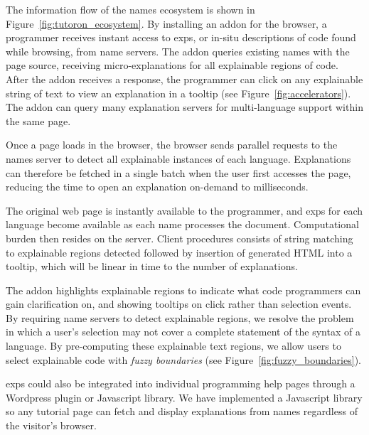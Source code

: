 The information flow of the \Glspl{name} ecosystem is shown in Figure~\ref{fig:tutoron_ecosystem}.
By installing an addon for the browser, a programmer receives instant access to \glspl{exp}, or in-situ descriptions of code found while browsing, from \Gls{name} servers.
The addon queries existing \Glspl{name} with the page source, receiving micro-explanations for all explainable regions of code.
After the addon receives a response, the programmer can click on any explainable string of text to view an explanation in a tooltip (see Figure~\ref{fig:accelerators}).
The addon can query many explanation servers for multi-language support within the same page.


\begin{changes}
Once a page loads in the browser, the browser sends parallel requests to the \Glspl{name} server to detect all explainable instances of each language.
Explanations can therefore be fetched in a single batch when the user first accesses the page, reducing the time to open an explanation on-demand to milliseconds.
\end{changes}
The original web page is instantly available to the programmer, and \glspl{exp} for each language become available as each \Gls{name} processes the document.
Computational burden then resides on the server.
 Client procedures consists of string matching to explainable regions detected followed by insertion of generated HTML into a tooltip, which will be linear in time to the number of explanations.\fi

\begin{changes}
The addon highlights explainable regions to indicate what code programmers can gain clarification on, and showing tooltips on click rather than selection events.
By requiring \Gls{name} servers to detect explainable regions, we resolve the problem in which a user's selection may not cover a complete statement of the syntax of a language.
By pre-computing these explainable text regions, we allow users to select explainable code with \emph{fuzzy boundaries} (see Figure~\ref{fig:fuzzy_boundaries}).
\end{changes}
  \fi

\begin{changes}
\Glspl{exp} could also be integrated into individual programming help pages through a Wordpress plugin or Javascript library.
We have implemented a Javascript library so any tutorial page can fetch and display explanations from \Glspl{name} regardless of the visitor's browser.
\end{changes}


